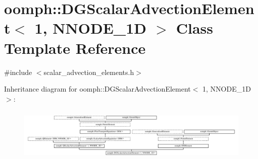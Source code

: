 \hypertarget{classoomph_1_1DGScalarAdvectionElement_3_011_00_01NNODE__1D_01_4}{}\section{oomph\+:\+:D\+G\+Scalar\+Advection\+Element$<$ 1, N\+N\+O\+D\+E\+\_\+1D $>$ Class Template Reference}
\label{classoomph_1_1DGScalarAdvectionElement_3_011_00_01NNODE__1D_01_4}


{\ttfamily \#include $<$scalar\+\_\+advection\+\_\+elements.\+h$>$}

Inheritance diagram for oomph\+:\+:D\+G\+Scalar\+Advection\+Element$<$ 1, N\+N\+O\+D\+E\+\_\+1D $>$\+:\begin{figure}[H]
\begin{center}
\leavevmode
\includegraphics[height=2.568807cm]{classoomph_1_1DGScalarAdvectionElement_3_011_00_01NNODE__1D_01_4}
\end{center}
\end{figure}
